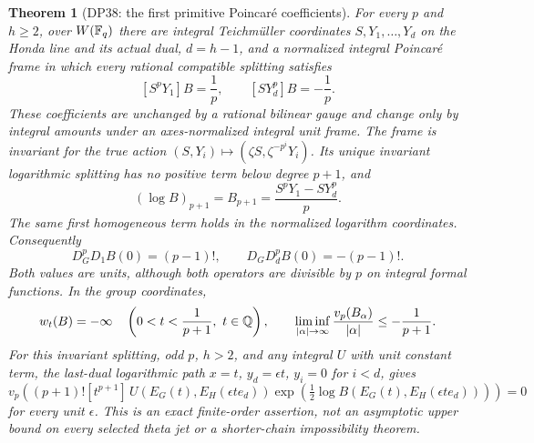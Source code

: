 \documentclass[11pt,a4paper]{article}
\newtheorem{theorem}{Theorem}[section]
\theoremstyle{definition}\newtheorem{remark}[theorem]{Remark}
\begin{document}
\begin{theorem}[DP38: the first primitive Poincar\'e coefficients]\label{DP38}
For every $p$ and $h\ge2$, over $W(\mathbb F_q)$ there are integral Teichm\"uller coordinates $S,Y_1,\ldots,Y_d$ on the Honda line and its actual dual, $d=h-1$, and a normalized integral Poincar\'e frame in which every rational compatible splitting satisfies
\[
 [S^pY_1]B=\frac1p,\qquad [SY_d^p]B=-\frac1p.
\]
These coefficients are unchanged by a rational bilinear gauge and change only by integral amounts under an axes-normalized integral unit frame. The frame is invariant for the true action $(S,Y_i)\mapsto(\zeta S,\zeta^{-p^i}Y_i)$. Its unique invariant logarithmic splitting has no positive term below degree $p+1$, and
\begin{equation}\label{eq:primitive-first}
 (\log B)_{p+1}=B_{p+1}=\frac{S^pY_1-SY_d^p}{p}.
\end{equation}
The same first homogeneous term holds in the normalized logarithm coordinates. Consequently
\[
 D_G^pD_1 B(0)=(p-1)!,\qquad D_GD_d^p B(0)=-(p-1)!.
\]
Both values are units, although both operators are divisible by $p$ on integral formal functions. In the group coordinates,
\[
 w_t(B)=-\infty\quad\left(0<t<\frac1{p+1},\ t\in\Q\right),\qquad
 \liminf_{|\alpha|\to\infty}\frac{v_p(B_\alpha)}{|\alpha|}\le-\frac1{p+1}.
\]
For this invariant splitting, odd $p$, $h>2$, and any integral $U$ with unit constant term, the last-dual logarithmic path $x=t$, $y_d=\epsilon t$, $y_i=0$ for $i<d$, gives
\begin{equation}\label{eq:primitive-path-unit}
 v_p\left((p+1)![t^{p+1}]\,
 U(E_G(t),E_H(\epsilon te_d))
 \exp\left(\tfrac12\log B(E_G(t),E_H(\epsilon te_d))\right)\right)=0
\end{equation}
for every unit $\epsilon$. This is an exact finite-order assertion, not an asymptotic upper bound on every selected theta jet or a shorter-chain impossibility theorem.
\end{theorem}
\end{document}
